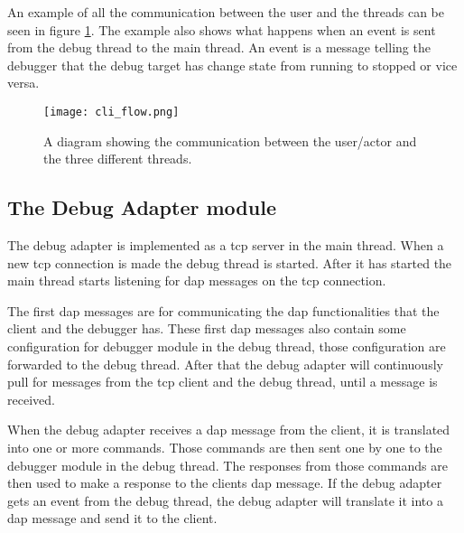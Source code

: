 An example of all the communication between the user and the threads can be seen in figure \ref{fig:cliflow}.
The example also shows what happens when an event is sent from the debug thread to the main thread.
An event is a message telling the debugger that the debug target has change state from running to stopped or vice versa.


\begin{figure}[h]
	\centering
	\texttt{[image: cli\_flow.png]}
	\caption{A diagram showing the communication between the user/actor and the three different threads.}
	\label{fig:cliflow}
\end{figure}




\subsection{The Debug Adapter module}


The debug adapter is implemented as a \gls{tcp} server in the main thread.
When a new \gls{tcp} connection is made the debug thread is started.
After it has started the main thread starts listening for \gls{dap} messages on the \gls{tcp} connection.


The first \gls{dap} messages are for communicating the \gls{dap} functionalities that the client and the debugger has.
These first \gls{dap} messages also contain some configuration for debugger module in the debug thread, those configuration are forwarded to the debug thread.
After that the debug adapter will continuously pull for messages from the \gls{tcp} client and the debug thread, until a message is received.


When the debug adapter receives a \gls{dap} message from the client, it is translated into one or more commands.
Those commands are then sent one by one to the debugger module in the debug thread.
The responses from those commands are then used to make a response to the clients \gls{dap} message.
If the debug adapter gets an event from the debug thread, the debug adapter will translate it into a \gls{dap} message and send it to the client.








